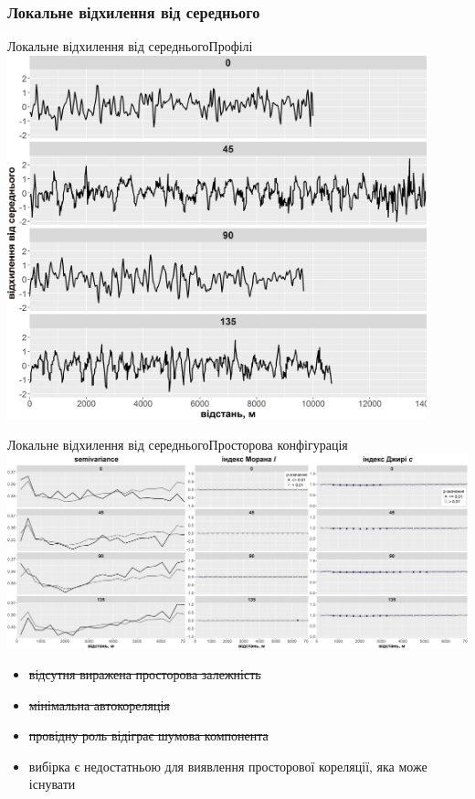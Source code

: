 \documentclass[]{beamer}
\begin{document}
\subsubsection{Локальне відхилення від середнього}
\begin{frame}{Локальне відхилення від середнього}{Профілі}
\includegraphics[width=0.91\textwidth]{./pres_figures/plots_dev_from_mean/profiles_plot.png}%
\end{frame}

\begin{frame}{Локальне відхилення від середнього}{Просторова конфігурація}
\includegraphics[width=\textwidth]{./pres_figures/plots_dev_from_mean/dev_from_mean_all.png}%

\begin{itemize}
\item \sout{відсутня виражена просторова залежність}
\item \sout{мінімальна автокореляція}
\item \sout{провідну роль відіграє шумова компонента}
\item вибірка є недостатньою для виявлення просторової кореляції, яка може існувати  
\end{itemize}
\end{frame}
\end{document}
